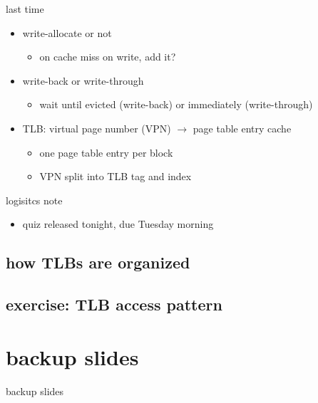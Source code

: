 \date{}
\title{}
\date{}

\begin{frame}
    \titlepage
\end{frame}


\usetikzlibrary{fit}


\begin{frame}{last time}
    \begin{itemize}
    \item write-allocate or not
        \begin{itemize}
        \item on cache miss on write, add it?
        \end{itemize}
    \item write-back or write-through
        \begin{itemize}
        \item wait until evicted (write-back) or immediately (write-through)
        \end{itemize}
    \item TLB: virtual page number (VPN) $\rightarrow$ page table entry cache
        \begin{itemize}
        \item one page table entry per block
        \item VPN split into TLB tag and index
        \end{itemize}
    \end{itemize}
\end{frame}

\begin{frame}{logisitcs note}
    \begin{itemize}
    \item quiz released tonight, due Tuesday morning
    \end{itemize}
\end{frame}


\subsection{how TLBs are organized}

\subsection{exercise: TLB access pattern}









\section{backup slides}
\begin{frame}{backup slides}
\end{frame}


